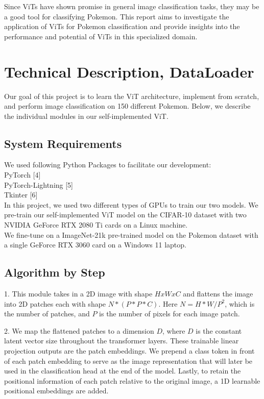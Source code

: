 \documentclass{article} %
\begin{document}
Since ViTs have shown promise in general image classification tasks, they may be a good 
tool for classifying Pokemon. This report aims to investigate the application of ViTs for 
Pokemon classification and provide insights into the performance and potential of ViTs in 
this specialized domain.

\section{Technical Description, DataLoader}
\label{gen_inst}

Our goal of this project is to learn the ViT architecture, implement from scratch, and
perform image classification on 150 different Pokemon. Below, we describe the individual 
modules in our self-implemented ViT.

\subsection{System Requirements}
We used following Python Packages to facilitate our development: \\
PyTorch [4] \\
PyTorch-Lightning [5] \\
Tkinter [6] \\

In this project, we used two different types of GPUs to train our two models.
We pre-train our self-implemented ViT model on the CIFAR-10 dataset with two NVIDIA GeForce RTX 2080 Ti cards on a Linux machine. \\
We fine-tune on a ImageNet-21k pre-trained model on the Pokemon dataset with a single GeForce RTX 3060 card on a Windows 11 laptop.

\subsection{Algorithm by Step}

1. This module takes in a 2D image with shape $HxWxC$ and flattens the image into 2D patches each with shape $N * (P * P * C)$.
Here $N = {H * W} / {P^2}$, which is the number of patches, and $P$ is the number of pixels for each image patch.

2. We map the flattened patches to a dimension $D$, where $D$ is the constant latent vector size throughout the transformer layers.
These trainable linear projection outputs are the patch embeddings.
We prepend a class token in front of each patch embedding to serve as the image representation that will later be used in the
classification head at the end of the model. Lastly, to retain the positional information of each patch relative to the original image,
a 1D learnable positional embeddings are added.
\end{document}
